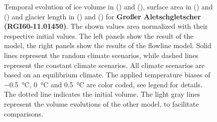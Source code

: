 \begin{figure}[p]
  \caption{Temporal evolution of ice volume in () and (), surface area in () and () and glacier length in () and () for \textbf{Großer Aletschgletscher (RGI60-11.01450)}. The shown values area normalized with their respective initial values. The left panels show the result of the \vas{} model, the right panels show the results of the flowline model. Solid lines represent the random climate scenarios, while dashed lines represent the constant climate scenarios. All climate scenarios are based on an equilibrium climate. The applied temperature biases of \SI{-.5}{\celsius}, \SI{0}{\celsius} and \SI{+.5}{\celsius} are color coded, see legend for details. The dotted line indicates the initial volume. The light gray lines represent the volume evolutions of the other model, to facilitate comparisons.}
  \label{fig:Grosser_Aletschgletscher}
\end{figure}

